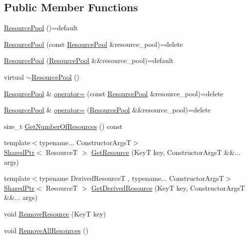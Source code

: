 \subsection*{Public Member Functions}
\begin{DoxyCompactItemize}
\item 
\hyperlink{classmage_1_1_resource_pool_a94aff142869744ed48fb1b426face48b}{Resource\+Pool} ()=default
\item 
\hyperlink{classmage_1_1_resource_pool_a82253c9c4adfc120a813dfe811dd5e91}{Resource\+Pool} (const \hyperlink{classmage_1_1_resource_pool}{Resource\+Pool} \&resource\+\_\+pool)=delete
\item 
\hyperlink{classmage_1_1_resource_pool_adea88e0bead1af27e39a3412527122f3}{Resource\+Pool} (\hyperlink{classmage_1_1_resource_pool}{Resource\+Pool} \&\&resource\+\_\+pool)=default
\item 
virtual \hyperlink{classmage_1_1_resource_pool_ae4fff3d951818d417f77965c2db265f6}{$\sim$\+Resource\+Pool} ()
\item 
\hyperlink{classmage_1_1_resource_pool}{Resource\+Pool} \& \hyperlink{classmage_1_1_resource_pool_ae8121e031efe9f98605e478b01b19d33}{operator=} (const \hyperlink{classmage_1_1_resource_pool}{Resource\+Pool} \&resource\+\_\+pool)=delete
\item 
\hyperlink{classmage_1_1_resource_pool}{Resource\+Pool} \& \hyperlink{classmage_1_1_resource_pool_a1c0c196460508108435c227c11a65b94}{operator=} (\hyperlink{classmage_1_1_resource_pool}{Resource\+Pool} \&\&resource\+\_\+pool)=delete
\item 
size\+\_\+t \hyperlink{classmage_1_1_resource_pool_ae2f9964a1821c9b8cb38303a5a88c98e}{Get\+Number\+Of\+Resources} () const
\item 
{\footnotesize template$<$typename... Constructor\+ArgsT$>$ }\\\hyperlink{namespacemage_a1e01ae66713838a7a67d30e44c67703e}{Shared\+Ptr}$<$ ResourceT $>$ \hyperlink{classmage_1_1_resource_pool_add76506394983fe84bc2cb95cfd5f7e2}{Get\+Resource} (KeyT key, Constructor\+ArgsT \&\&... args)
\item 
{\footnotesize template$<$typename Derived\+ResourceT , typename... Constructor\+ArgsT$>$ }\\\hyperlink{namespacemage_a1e01ae66713838a7a67d30e44c67703e}{Shared\+Ptr}$<$ ResourceT $>$ \hyperlink{classmage_1_1_resource_pool_a2c1116cecf0a88953fa681f254de8680}{Get\+Derived\+Resource} (KeyT key, Constructor\+ArgsT \&\&... args)
\item 
void \hyperlink{classmage_1_1_resource_pool_acda87b2a5cc6ea3880f40df0ac6fb4d9}{Remove\+Resource} (KeyT key)
\item 
void \hyperlink{classmage_1_1_resource_pool_a83a33e15bd8f326d0ebc11b3f8e52a41}{Remove\+All\+Resources} ()
\end{DoxyCompactItemize}
